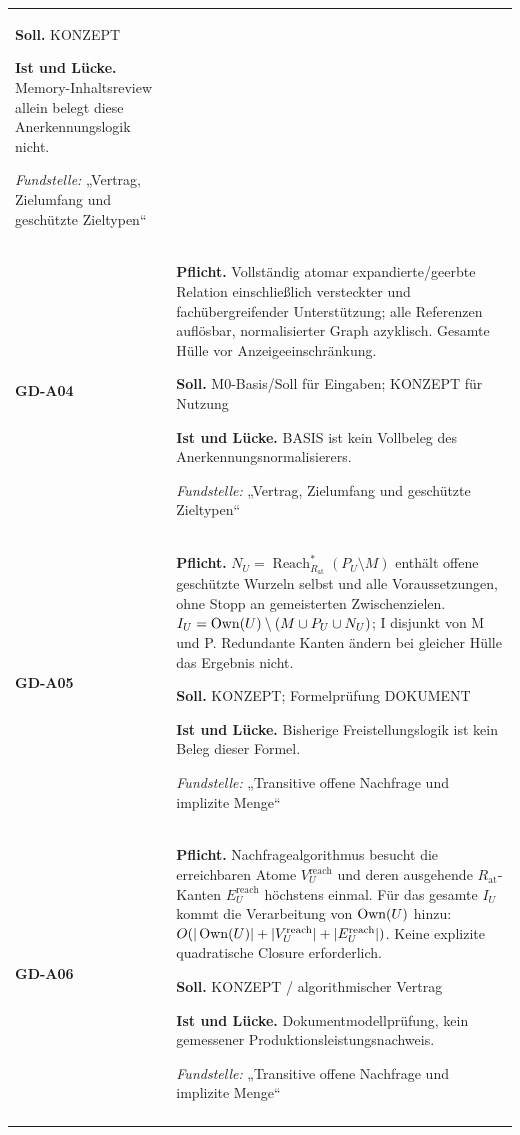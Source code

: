 \begin{longtable}{@{}P{20mm}P{128mm}@{}}
\textbf{Soll.} KONZEPT\par\smallskip
\textbf{Ist und Lücke.} Memory-Inhaltsreview allein belegt diese Anerkennungslogik nicht.\par\smallskip
\emph{Fundstelle:} „Vertrag, Zielumfang und geschützte Zieltypen“\\\addlinespace[5pt]
\label{rule:GD-A04}\textbf{GD-A04} &
\textbf{Pflicht.} Vollständig atomar expandierte/geerbte Relation einschließlich versteckter und fachübergreifender Unterstützung; alle Referenzen auflösbar, normalisierter Graph azyklisch. Gesamte Hülle vor Anzeigeeinschränkung.\par\smallskip
\textbf{Soll.} M0-Basis/Soll für Eingaben; KONZEPT für Nutzung\par\smallskip
\textbf{Ist und Lücke.} BASIS ist kein Vollbeleg des Anerkennungsnormalisierers.\par\smallskip
\emph{Fundstelle:} „Vertrag, Zielumfang und geschützte Zieltypen“\\\addlinespace[5pt]
\label{rule:GD-A05}\textbf{GD-A05} &
\textbf{Pflicht.} \(N_U=\operatorname{Reach}_{R_{\mathrm{at}}}^{*}(P_U\setminus M)\) enthält offene geschützte Wurzeln selbst und alle Voraussetzungen, ohne Stopp an gemeisterten Zwischenzielen. \(I_U=\operatorname{Own}(U)\setminus(M\cup P_U\cup N_U)\); I disjunkt von M und P. Redundante Kanten ändern bei gleicher Hülle das Ergebnis nicht.\par\smallskip
\textbf{Soll.} KONZEPT; Formelprüfung DOKUMENT\par\smallskip
\textbf{Ist und Lücke.} Bisherige Freistellungslogik ist kein Beleg dieser Formel.\par\smallskip
\emph{Fundstelle:} „Transitive offene Nachfrage und implizite Menge“\\\addlinespace[5pt]
\label{rule:GD-A06}\textbf{GD-A06} &
\textbf{Pflicht.} Nachfragealgorithmus besucht die erreichbaren Atome \(V_U^{\mathrm{reach}}\) und deren ausgehende \(R_{\mathrm{at}}\)-Kanten \(E_U^{\mathrm{reach}}\) höchstens einmal. Für das gesamte \(I_U\) kommt die Verarbeitung von \(\operatorname{Own}(U)\) hinzu: \(O(|\operatorname{Own}(U)|+|V_U^{\mathrm{reach}}|+|E_U^{\mathrm{reach}}|)\). Keine explizite quadratische Closure erforderlich.\par\smallskip
\textbf{Soll.} KONZEPT / algorithmischer Vertrag\par\smallskip
\textbf{Ist und Lücke.} Dokumentmodellprüfung, kein gemessener Produktionsleistungsnachweis.\par\smallskip
\emph{Fundstelle:} „Transitive offene Nachfrage und implizite Menge“\\\addlinespace[5pt]

\end{longtable}
